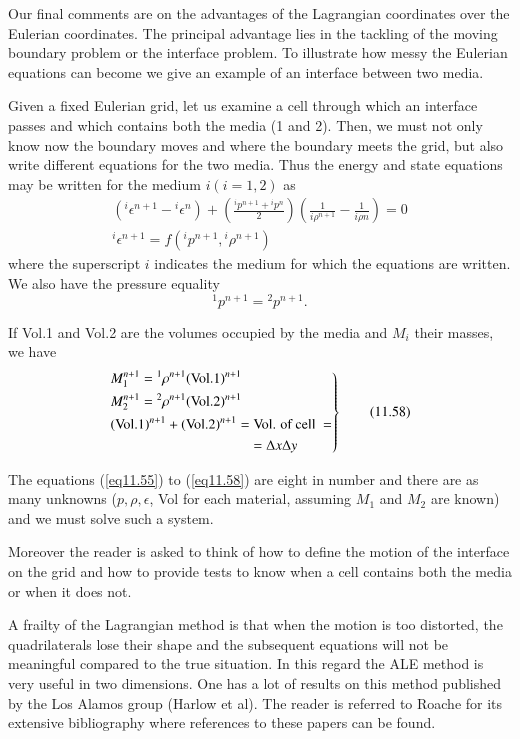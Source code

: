 \begin{remark}\label{chap11:rem11.7}
Our final comments are on the advantages of the Lagrangian coordinates over the Eulerian coordinates. The principal advantage lies in the tackling of the moving boundary problem or the interface problem. To illustrate how messy the Eulerian equations can become we give an example of an interface between two media.

Given a fixed Eulerian grid, let us examine a cell through which an interface passes and which contains both the media (1 and 2). Then, we must not only know now the boundary moves and where the boundary meets the grid, but also write different equations for the two media. Thus the energy and state equations may be written for the medium $i(i=1,2)$ as
\begin{gather*}
({}^i \epsilon^{n+1} - {}^i \epsilon^n) + \left(\frac{{}^i p^{n+1} +
    {}^ip^n}{2}\right)  \left(\frac{1}{i \rho^{n+1} } - \frac{1}{i
    \rho n }\right) = 0 \tag{11.55}\label{eq11.55}\\ 
  {}^i  \epsilon^{n+1} = f ({}^i p^{n+1}, {}^i \rho^{n+1})
  \tag{11.56}\label{eq11.56} 
\end{gather*}
where the superscript $i$ indicates the medium for which the equations are written. We also have the pressure equality 
\begin{equation*}
{}^1 p^{n+1} = {}^2 p^{n+1}. \tag{11.57}\label{eq11.57}
\end{equation*}\pageoriginale

If Vol.1 and Vol.2 are the volumes occupied by the media and $M_i$ their masses, we have 
\begin{equation*}
\left. 
\begin{aligned}
& M^{n+1}_1 = {}^1 \rho^{n+1}  (\text{Vol.}1)^{n+1}\\
& M^{n+1}_2 = {}^2 \rho^{n+1}  (\text{Vol.}2)^{n+1}\\
& (\text{Vol.}1)^{n+1} + (\text{Vol.}2)^{n+1}  = \text{Vol. of cell } =\\
& \hspace{3.5cm} = \Delta x \Delta y
\end{aligned}
\right\}
\tag{11.58}\label{eq11.58}
\end{equation*}

The equations (\ref{eq11.55}) to (\ref{eq11.58}) are eight in number and there are as many unknowns ($p, \rho, \epsilon$, Vol for each material, assuming $M_1$ and $M_2$ are known) and we must solve such a system.

Moreover the reader is asked to think of how to define the motion of
the interface on the grid and how to provide tests to know when a cell
contains both the media or when it does not. 

A frailty of the Lagrangian method is that when the motion is too
distorted, the quadrilaterals lose their shape and the subsequent
equations will not be meaningful compared to the true situation. In
this regard the ALE method is very useful in two dimensions. One has a
lot of results on this method published by the Los Alamos group
(Harlow et al). The reader is referred to Roache \cite{key33} for its
extensive bibliography where references to these papers can be found. 
\end{remark}

